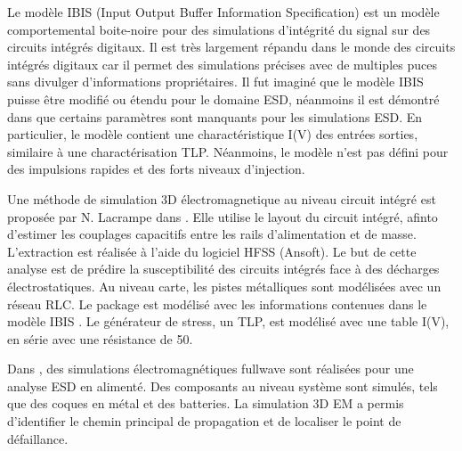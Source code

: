 Le modèle IBIS (Input Output Buffer Information Specification) \cite{ibis-spec} est un modèle comportemental boite-noire pour des simulations d'intégrité du signal sur des circuits intégrés digitaux.
Il est très largement répandu dans le monde des circuits intégrés digitaux car il permet des simulations précises avec de multiples puces sans divulger d'informations propriétaires.
Il fut imaginé que le modèle IBIS puisse être modifié ou étendu pour le domaine ESD, néanmoins il est démontré dans  \cite{ibisImprovementFabrice} que certains paramètres sont manquants pour les simulations ESD.
En particulier, le modèle contient une charactéristique I(V) des entrées sorties, similaire à une charactérisation TLP.
Néanmoins, le modèle n'est pas défini pour des impulsions rapides et des forts niveaux d'injection.

Une méthode de simulation 3D électromagnetique au niveau circuit intégré est proposée par N. Lacrampe dans \cite{LacrampeTransientImmunity}.
Elle utilise le layout du circuit intégré, afinto d'estimer les couplages capacitifs entre les rails d'alimentation et de masse.
L'extraction est réalisée à l'aide du logiciel HFSS (Ansoft).
Le but de cette analyse est de prédire la susceptibilité des circuits intégrés face à des décharges électrostatiques.
Au niveau carte, les pistes métalliques sont modélisées avec un réseau RLC.
Le package est modélisé avec les informations contenues dans le modèle IBIS \cite{ibis-spec}.
Le générateur de stress, un TLP, est modélisé avec une table I(V), en série avec une résistance de 50\textOmega{}.

Dans \cite{softFailMobile}, des simulations électromagnétiques fullwave sont réalisées pour une analyse ESD en alimenté.
Des composants au niveau système sont simulés, tels que des coques en métal et des batteries.
La simulation 3D EM a permis d'identifier le chemin principal de propagation et de localiser le point de défaillance.
